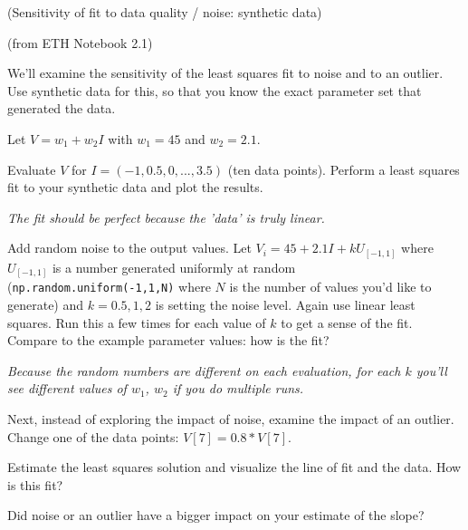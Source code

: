 \documentclass[12pt,letterpaper,noanswers]{exam}
\begin{document}
\begin{questions}
\question (Sensitivity of fit to data quality / noise: synthetic data)

(from ETH Notebook 2.1)

We'll examine the sensitivity of the least squares fit to noise and to an outlier.  Use synthetic data for this, so that you know the exact parameter set that generated the data.

 
\begin{parts}
\item Let $V = w_1 + w_2I$ with $w_1 = 45$ and $w_2 = 2.1$. 

Evaluate $V$ for $I = (-1, 0.5, 0, ..., 3.5)$ (ten data points).  Perform a least squares fit to your synthetic data and plot the results.

\emph{The fit should be perfect because the 'data' is truly linear.}

\item Add random noise to the output values.  Let $V_i = 45 + 2.1 I + k U_{[-1,1]}$ where $U_{[-1,1]}$ is a number generated uniformly at random (\texttt{np.random.uniform(-1,1,N)} where $N$ is the number of values you'd like to generate) and $k = 0.5,1,2$ is setting the noise level.  Again use linear least squares.  Run this a few times for each value of $k$ to get a sense of the fit.  Compare to the example parameter values: how is the fit?

\emph{Because the random numbers are different on each evaluation, for each $k$ you'll see different values of $w_1$, $w_2$ if you do multiple runs.}

\item Next, instead of exploring the impact of noise, examine the impact of an outlier.  Change one of the data points: $V[7] = 0.8*V[7]$.  

Estimate the least squares solution and visualize the line of fit and the data.  How is this fit?

\item Did noise or an outlier have a bigger impact on your estimate of the slope?
\end{parts}






\end{questions}
\end{document}
